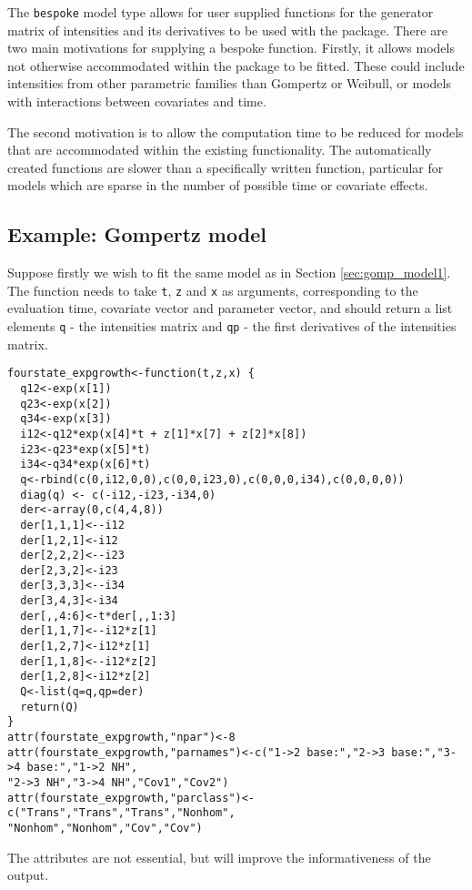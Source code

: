 \documentclass{article}
\numberwithin{equation}{section}
\begin{document}
The \verb!bespoke! model type allows for user supplied functions for the generator matrix of intensities and its derivatives to be used with the package. There are two main motivations for supplying a bespoke function. Firstly, it allows models not otherwise accommodated within the package to be fitted. These could include intensities from other parametric families than Gompertz or Weibull, or models with interactions between covariates and time.

The second motivation is to allow the computation time to be reduced for models that are accommodated within the existing functionality. The automatically created functions are slower than a specifically written function, particular for models which are sparse in the number of possible time or covariate effects.

\subsection{Example: Gompertz model}

Suppose firstly we wish to fit the same model as in Section \ref{sec:gomp_model1}. The function needs to take \verb!t!, \verb!z! and \verb!x! as arguments, corresponding to the evaluation time, covariate vector and parameter vector, and should return a list elements \verb!q! - the intensities matrix and  \verb!qp! - the first derivatives of the intensities matrix.

\begin{verbatim}
fourstate_expgrowth<-function(t,z,x) {
  q12<-exp(x[1])
  q23<-exp(x[2])
  q34<-exp(x[3])
  i12<-q12*exp(x[4]*t + z[1]*x[7] + z[2]*x[8])
  i23<-q23*exp(x[5]*t)
  i34<-q34*exp(x[6]*t)
  q<-rbind(c(0,i12,0,0),c(0,0,i23,0),c(0,0,0,i34),c(0,0,0,0))
  diag(q) <- c(-i12,-i23,-i34,0)
  der<-array(0,c(4,4,8))
  der[1,1,1]<--i12
  der[1,2,1]<-i12
  der[2,2,2]<--i23
  der[2,3,2]<-i23
  der[3,3,3]<--i34
  der[3,4,3]<-i34
  der[,,4:6]<-t*der[,,1:3]
  der[1,1,7]<--i12*z[1]
  der[1,2,7]<-i12*z[1]
  der[1,1,8]<--i12*z[2]
  der[1,2,8]<-i12*z[2]
  Q<-list(q=q,qp=der)
  return(Q)
}
attr(fourstate_expgrowth,"npar")<-8
attr(fourstate_expgrowth,"parnames")<-c("1->2 base:","2->3 base:","3->4 base:","1->2 NH",
"2->3 NH","3->4 NH","Cov1","Cov2")
attr(fourstate_expgrowth,"parclass")<-c("Trans","Trans","Trans","Nonhom",
"Nonhom","Nonhom","Cov","Cov")
\end{verbatim}

The attributes are not essential, but will improve the informativeness of the output.
\end{document}
